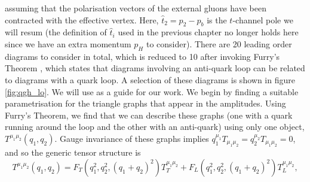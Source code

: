 assuming that the polarisation vectors of the external gluons have been contracted with the effective vertex. Here, $\hat{t}_2 = p_2 - p_b$ is the $t$-channel pole we will resum (the definition of $\hat{t}_i$ used in the previous chapter no longer holds here since we have an extra momentum $p_H$ to consider). There are 20 leading order diagrams to consider in total, which is reduced to 10 after invoking Furry's Theorem \cite{Atkin2015}, which states that diagrams involving an anti-quark loop can be related to diagrams with a quark loop. A selection of these diagrams is shown in figure \ref{fig:qgh_lo}. We will use \cite{DelDuca2001} as a guide for our work. We begin by finding a suitable parametrisation for the triangle graphs that appear in the amplitudes. Using Furry's Theorem, we find that we can describe these graphs (one with a quark running around the loop and the other with an anti-quark) using only one object, $T^{\mu_1 \mu_2}(q_1,q_2)$. Gauge invariance of these graphs implies $q_1^{\mu_1} T_{\mu_1 \mu_2} = q_2^{\mu_2}T_{\mu_1 \mu_2} = 0$, and so the generic tensor structure is
\begin{equation}
T^{\mu_1 \mu_2} (q_1, q_2) = F_T(q_1^2, q_2^2,(q_1+q_2)^2) T_T^{\mu_1 \mu_2} + F_L(q_1^2, q_2^2,(q_1+q_2)^2) T_L^{\mu_1 \mu_2},
\end{equation}
